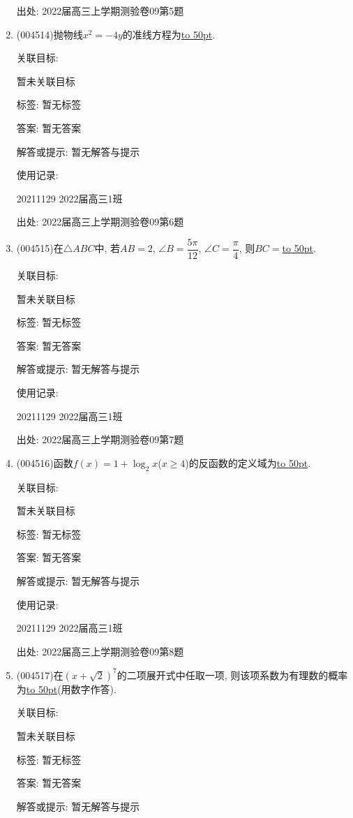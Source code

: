 \documentclass[10pt,a4paper]{article}
\newcommand{\blank}[1]{\underline{\hbox to #1pt{}}}
\begin{document}
\begin{enumerate}[1.]
出处: 2022届高三上学期测验卷09第5题
\item { (004514)}抛物线$x^2=-4y$的准线方程为\blank{50}.


关联目标:

暂未关联目标



标签: 暂无标签

答案: 暂无答案

解答或提示: 暂无解答与提示

使用记录:

20211129	2022届高三1班	


出处: 2022届高三上学期测验卷09第6题
\item { (004515)}在$\triangle ABC$中, 若$AB=2$, $\angle B=\dfrac{5\pi}{12}$, $\angle C=\dfrac{\pi}4$, 则$BC=$\blank{50}.


关联目标:

暂未关联目标



标签: 暂无标签

答案: 暂无答案

解答或提示: 暂无解答与提示

使用记录:

20211129	2022届高三1班	


出处: 2022届高三上学期测验卷09第7题
\item { (004516)}函数$f(x)=1+\log_2x$($x\ge 4$)的反函数的定义域为\blank{50}.


关联目标:

暂未关联目标



标签: 暂无标签

答案: 暂无答案

解答或提示: 暂无解答与提示

使用记录:

20211129	2022届高三1班	


出处: 2022届高三上学期测验卷09第8题
\item { (004517)}在$(x+\sqrt 2)^7$的二项展开式中任取一项, 则该项系数为有理数的概率为\blank{50}(用数字作答).


关联目标:

暂未关联目标



标签: 暂无标签

答案: 暂无答案

解答或提示: 暂无解答与提示


\end{enumerate}
\end{document}
